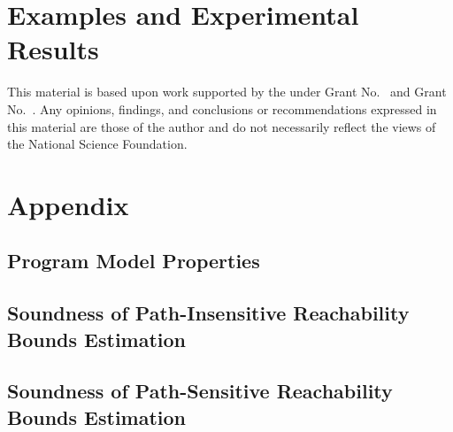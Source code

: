 \documentclass[sigplan,10pt,review,anonymous]{acmart}
\begin{document}
\section{Examples and Experimental Results}
\label{sec:example}


\begin{acks}                            
This material is based upon work supported by the
 under Grant
No.~ and Grant
No.~.  Any opinions, findings, and
conclusions or recommendations expressed in this material are those
of the author and do not necessarily reflect the views of the
National Science Foundation.
\end{acks}

%


\appendix
\section{Appendix}
\subsection{Program Model Properties}
\label{apdx:lemma_sec123}
% 

\subsection{Soundness of Path-Insensitive Reachability Bounds Estimation}
\label{apdx:pathinsensitive_rb_soundness}
% 

\subsection{Soundness of Path-Sensitive Reachability Bounds Estimation}
\label{apdx:pathsensitive_rb_soundness}
\end{document}
